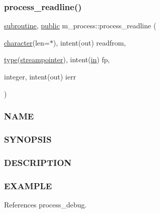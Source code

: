\subsubsection{\texorpdfstring{process\+\_\+readline()}{process\_readline()}}
{\footnotesize\ttfamily \hyperlink{M__stopwatch_83_8txt_acfbcff50169d691ff02d4a123ed70482}{subroutine}, \hyperlink{M__stopwatch_83_8txt_a2f74811300c361e53b430611a7d1769f}{public} m\+\_\+process\+::process\+\_\+readline (\begin{DoxyParamCaption}\item[{\hyperlink{option__stopwatch_83_8txt_abd4b21fbbd175834027b5224bfe97e66}{character}(len=$\ast$), intent(out)}]{readfrom,  }\item[{\hyperlink{stop__watch_83_8txt_a70f0ead91c32e25323c03265aa302c1c}{type}(\hyperlink{structm__process_1_1streampointer}{streampointer}), intent(\hyperlink{M__journal_83_8txt_afce72651d1eed785a2132bee863b2f38}{in})}]{fp,  }\item[{integer, intent(out)}]{ierr }\end{DoxyParamCaption})}



\subsubsection*{N\+A\+ME}

\subsubsection*{S\+Y\+N\+O\+P\+S\+IS}

\subsubsection*{D\+E\+S\+C\+R\+I\+P\+T\+I\+ON}

\subsubsection*{E\+X\+A\+M\+P\+LE}

References process\+\_\+debug.

\mbox{\label{namespacem__process_a08887a918eba167ceacddf58ca084270}} 
